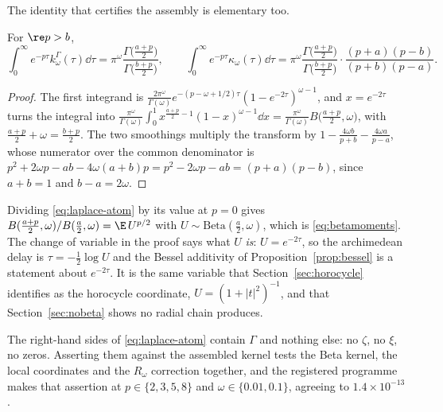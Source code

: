 The identity that certifies the assembly is elementary too.

\begin{proposition}\label{prop:laplace}
For $\re p>b$,
\begin{equation}\label{eq:laplace-atom}
 \int_0^\infty e^{-p\tau}k^\Gamma_\omega(\tau)\dd\tau
 =\pi^\omega\frac{\Gamma\big(\frac{a+p}2\big)}{\Gamma\big(\frac{b+p}2\big)},
 \qquad
 \int_0^\infty e^{-p\tau}\kappa_\omega(\tau)\dd\tau
 =\pi^\omega\frac{\Gamma\big(\frac{a+p}2\big)}{\Gamma\big(\frac{b+p}2\big)}
 \cdot\frac{(p+a)(p-b)}{(p+b)(p-a)} .
\end{equation}
\end{proposition}
\begin{proof}
The first integrand is
$\frac{2\pi^\omega}{\Gamma(\omega)}e^{-(p-\omega+1/2)\tau}(1-e^{-2\tau})^{\omega-1}$,
and $x=e^{-2\tau}$ turns the integral into
$\frac{\pi^\omega}{\Gamma(\omega)}\int_0^1x^{\frac{a+p}2-1}(1-x)^{\omega-1}\dd x
=\frac{\pi^\omega}{\Gamma(\omega)}B\big(\frac{a+p}2,\omega\big)$, with
$\frac{a+p}2+\omega=\frac{b+p}2$. The two smoothings multiply the transform by
$1-\frac{4\omega b}{p+b}-\frac{4\omega a}{p-a}$, whose numerator over the common
denominator is $p^2+2\omega p-ab-4\omega(a+b)p=p^2-2\omega p-ab=(p+a)(p-b)$,
since $a+b=1$ and $b-a=2\omega$.
\end{proof}

\begin{remark}\label{rem:betavar}
Dividing \eqref{eq:laplace-atom} by its value at $p=0$ gives
$B(\frac{a+p}2,\omega)/B(\frac a2,\omega)=\E\,U^{p/2}$ with
$U\sim\mathrm{Beta}(\frac a2,\omega)$, which is \eqref{eq:betamoments}. The
change of variable in the proof says what $U$ \emph{is}: $U=e^{-2\tau}$, so the
archimedean delay is $\tau=-\frac12\log U$ and the Bessel additivity of
Proposition~\ref{prop:bessel} is a statement about $e^{-2\tau}$. It is the same
variable that Section~\ref{sec:horocycle} identifies as the horocycle
coordinate, $U=(1+|t|^2)^{-1}$, and that Section~\ref{sec:nobeta} shows no
radial chain produces.
\end{remark}

The right-hand sides of \eqref{eq:laplace-atom} contain $\Gamma$ and nothing
else: no $\zeta$, no $\xi$, no zeros. Asserting them against the assembled
kernel tests the Beta kernel, the local coordinates and the $R_\omega$
correction together, and the registered programme makes that assertion at
$p\in\{2,3,5,8\}$ and $\omega\in\{0.01,0.1\}$, agreeing to $1.4\times10^{-13}$.

